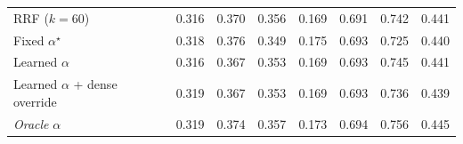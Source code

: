 \begin{table}[t]
\begin{tabular}{lccccccc}
RRF ($k{=}60$) & 0.316 & 0.370 & 0.356 & 0.169 & 0.691 & 0.742 & 0.441 \\
Fixed $\alpha^\star$ & 0.318 & 0.376 & 0.349 & 0.175 & 0.693 & 0.725 & 0.440 \\
Learned $\alpha$ & 0.316 & 0.367 & 0.353 & 0.169 & 0.693 & 0.745 & 0.441 \\
Learned $\alpha$ + dense override & 0.319 & 0.367 & 0.353 & 0.169 & 0.693 & 0.736 & 0.439 \\
\textit{Oracle} $\alpha$ & 0.319 & 0.374 & 0.357 & 0.173 & 0.694 & 0.756 & 0.445 \\
\bottomrule
\end{tabular}
\end{table}
